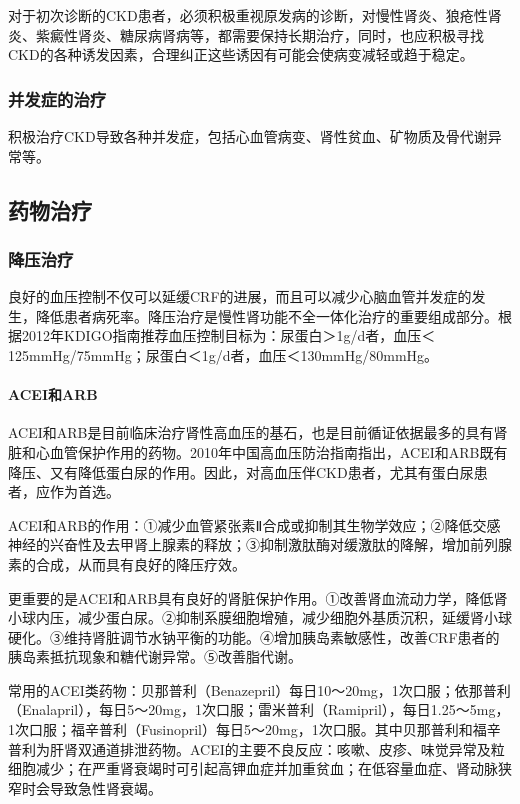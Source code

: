 对于初次诊断的CKD患者，必须积极重视原发病的诊断，对慢性肾炎、狼疮性肾炎、紫癜性肾炎、糖尿病肾病等，都需要保持长期治疗，同时，也应积极寻找CKD的各种诱发因素，合理纠正这些诱因有可能会使病变减轻或趋于稳定。

\subsubsection{并发症的治疗}

积极治疗CKD导致各种并发症，包括心血管病变、肾性贫血、矿物质及骨代谢异常等。

\subsection{药物治疗}

\subsubsection{降压治疗}

良好的血压控制不仅可以延缓CRF的进展，而且可以减少心脑血管并发症的发生，降低患者病死率。降压治疗是慢性肾功能不全一体化治疗的重要组成部分。根据2012年KDIGO指南推荐血压控制目标为：尿蛋白＞1g/d者，血压＜125mmHg/75mmHg；尿蛋白＜1g/d者，血压＜130mmHg/80mmHg。
\paragraph{ACEI和ARB}

ACEI和ARB是目前临床治疗肾性高血压的基石，也是目前循证依据最多的具有肾脏和心血管保护作用的药物。2010年中国高血压防治指南指出，ACEI和ARB既有降压、又有降低蛋白尿的作用。因此，对高血压伴CKD患者，尤其有蛋白尿患者，应作为首选。

ACEI和ARB的作用：①减少血管紧张素Ⅱ合成或抑制其生物学效应；②降低交感神经的兴奋性及去甲肾上腺素的释放；③抑制激肽酶对缓激肽的降解，增加前列腺素的合成，从而具有良好的降压疗效。

更重要的是ACEI和ARB具有良好的肾脏保护作用。①改善肾血流动力学，降低肾小球内压，减少蛋白尿。②抑制系膜细胞增殖，减少细胞外基质沉积，延缓肾小球硬化。③维持肾脏调节水钠平衡的功能。④增加胰岛素敏感性，改善CRF患者的胰岛素抵抗现象和糖代谢异常。⑤改善脂代谢。

常用的ACEI类药物：贝那普利（Benazepril）每日10～20mg，1次口服；依那普利（Enalapril），每日5～20mg，1次口服；雷米普利（Ramipril），每日1.25～5mg，1次口服；福辛普利（Fusinopril）每日5～20mg，1次口服。其中贝那普利和福辛普利为肝肾双通道排泄药物。ACEI的主要不良反应：咳嗽、皮疹、味觉异常及粒细胞减少；在严重肾衰竭时可引起高钾血症并加重贫血；在低容量血症、肾动脉狭窄时会导致急性肾衰竭。


